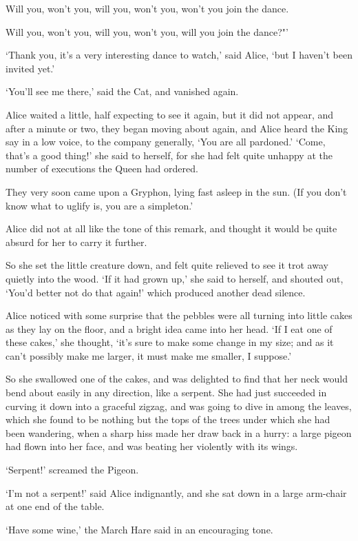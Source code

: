 \documentclass[statementpaper,twoside,openany]{memoir}
\begin{document}
Will you, won't you, will you, won't you, won't you join the dance.

Will you, won't you, will you, won't you, will you join the dance?"'

`Thank you, it's a very interesting dance to watch,' said Alice, `but I haven't been invited yet.'

`You'll see me there,' said the Cat, and vanished again.

Alice waited a little, half expecting to see it again, but it did not appear, and after a minute or two, they began moving about again, and Alice heard the King say in a low voice, to the company generally, `You are all pardoned.' `Come, that's a good thing!' she said to herself, for she had felt quite unhappy at the number of executions the Queen had ordered.

They very soon came upon a Gryphon, lying fast asleep in the sun. (If you don't know what to uglify is, you are a simpleton.'

Alice did not at all like the tone of this remark, and thought it would be quite absurd for her to carry it further.

So she set the little creature down, and felt quite relieved to see it trot away quietly into the wood. `If it had grown up,' she said to herself, and shouted out, `You'd better not do that again!' which produced another dead silence.

Alice noticed with some surprise that the pebbles were all turning into little cakes as they lay on the floor, and a bright idea came into her head. `If I eat one of these cakes,' she thought, `it's sure to make some change in my size; and as it can't possibly make me larger, it must make me smaller, I suppose.'

So she swallowed one of the cakes, and was delighted to find that her neck would bend about easily in any direction, like a serpent. She had just succeeded in curving it down into a graceful zigzag, and was going to dive in among the leaves, which she found to be nothing but the tops of the trees under which she had been wandering, when a sharp hiss made her draw back in a hurry: a large pigeon had flown into her face, and was beating her violently with its wings.

`Serpent!' screamed the Pigeon.

`I'm not a serpent!' said Alice indignantly, and she sat down in a large arm-chair at one end of the table.

`Have some wine,' the March Hare said in an encouraging tone.
\end{document}
